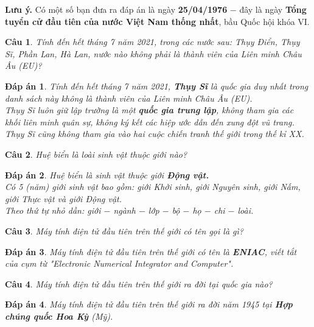 \documentclass[12pt,a4paper]{article}
\newtheorem{ques}{Câu}
\theoremstyle{nonumberplain}
\newtheorem{ans}{Đáp án}
\begin{document}
\textbf{Lưu ý.} Có một số bạn đưa ra đáp án là ngày \textbf{25/04/1976} \(-\) đây là ngày \textbf{Tổng tuyển cử đầu tiên của nước Việt Nam thống nhất}, bầu Quốc hội khóa VI.
\begin{ques}
Tính đến hết tháng 7 năm 2021, trong các nước sau: Thụy Điển, Thụy Sĩ, Phần Lan, Hà Lan, nước nào không phải là thành viên của Liên minh Châu Âu (EU)?
\end{ques}
\begin{mybox}
\begin{ans}
Tính đến hết tháng 7 năm 2021, \textbf{Thụy Sĩ} là quốc gia duy nhất trong danh sách này không là thành viên của Liên minh Châu Âu (EU).\\
Thụy Sĩ luôn giữ lập trường là một \textbf{\textit{quốc gia trung lập}}, không tham gia các khối liên minh quân sự, không ký kết các hiệp ước dẫn đến xung đột vũ trang. Thụy Sĩ cũng không tham gia vào hai cuộc chiến tranh thế giới trong thế kỉ XX.
\end{ans} \end{mybox}
\begin{ques}
Huệ biển là loài sinh vật thuộc giới nào?
\end{ques}
\begin{mybox} \begin{ans}
Huệ biển là sinh vật thuộc giới \textbf{Động vật.}\\
Có 5 (năm) giới sinh vật bao gồm: giới Khởi sinh, giới Nguyên sinh, giới Nấm, giới Thực vật và giới Động vật.\\
Theo thứ tự nhỏ dần: giới \(-\) ngành \(-\) lớp \(-\) bộ \(-\) họ \(-\) chi \(-\) loài.
\end{ans} \end{mybox}
\begin{ques}
Máy tính điện tử đầu tiên trên thế giới có tên gọi là gì?
\end{ques}
\begin{mybox} \begin{ans}
Máy tính điện tử đầu tiên trên thế giới có tên là \textbf{ENIAC}, viết tắt của cụm từ \textit{"Electronic Numerical Integrator and Computer"}.
\end{ans} \end{mybox}
\begin{ques}
Máy tính điện tử đầu tiên trên thế giới ra đời tại quốc gia nào?
\end{ques}
\begin{mybox} \begin{ans}
Máy tính điện tử đầu tiên trên thế giới ra đời năm 1945 tại \textbf{Hợp chúng quốc Hoa Kỳ} (Mỹ).
\end{ans} \end{mybox}
\end{document}
